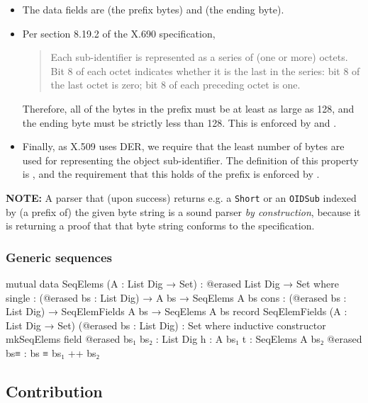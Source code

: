 \documentclass[11pt]{article}
\begin{document}
\begin{itemize}
\item The data fields are  (the prefix bytes) and 
(the ending byte).

\item Per section 8.19.2 of the X.690 specification,

\begin{quote}
Each sub-identifier is represented as a series of (one or more) octets. Bit 8
of each octet indicates whether it is the last in the series: bit 8 of the
last octet is zero; bit 8 of each preceding octet is one.
\end{quote}

Therefore, all of the bytes in the prefix must be at least as large as 128,
and the ending byte must be strictly less than 128.
This is enforced by  and .

\item Finally, as X.509 uses DER, we require that the least number of bytes are
used for representing the object sub-identifier.
The definition of this property is , and the
requirement that this holds of the prefix  is enforced by
.
\end{itemize}

\textbf{NOTE:} A parser that (upon success) returns e.g. a \texttt{Short} or an \texttt{OIDSub}
indexed by (a prefix of) the given byte string is a sound parser \emph{by
construction}, because it is returning a proof that that byte string conforms
to the specification.

\subsubsection{Generic sequences}
\label{sec:org2264c78}

\begin{code}
mutual
  data SeqElems (A : List Dig → Set) : @erased List Dig → Set where
    single : (@erased bs : List Dig) → A bs → SeqElems A bs
    cons   : (@erased bs : List Dig) → SeqElemFields A bs → SeqElems A bs
  record SeqElemFields (A : List Dig → Set) (@erased bs : List Dig) : Set where
    inductive
    constructor mkSeqElems
    field
      @erased bs₁ bs₂ : List Dig
      h : A bs₁
      t : SeqElems A bs₂
      @erased bs≡ : bs ≡ bs₁ ++ bs₂
\end{code}

\subsection{Contribution}
\label{sec:org9abbf24}
\end{document}

